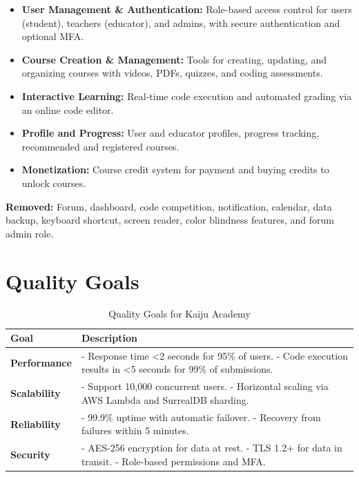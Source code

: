 \documentclass[a4paper, 11pt]{scrreprt}
\begin{document}
\begin{itemize}
    \item \textbf{User Management \& Authentication:} Role-based access control for users (student), teachers (educator), and admins, with secure authentication and optional MFA.
    \item \textbf{Course Creation \& Management:} Tools for creating, updating, and organizing courses with videos, PDFs, quizzes, and coding assessments.
    \item \textbf{Interactive Learning:} Real-time code execution and automated grading via an online code editor.
    \item \textbf{Profile and Progress:} User and educator profiles, progress tracking, recommended and registered courses.
    \item \textbf{Monetization:} Course credit system for payment and buying credits to unlock courses.
\end{itemize}

\textbf{Removed:} Forum, dashboard, code competition, notification, calendar, data backup, keyboard shortcut, screen reader, color blindness features, and forum admin role.

\section{Quality Goals}
\begin{table}[htp]
    \centering
    \begin{tabularx}{\textwidth}{|l|X|}
        \hline
        \textbf{Goal} & \textbf{Description} \\
        \hline
        \textbf{Performance} & - Response time <2 seconds for 95\% of users. \newline - Code execution results in <5 seconds for 99\% of submissions. \\
        \hline
        \textbf{Scalability} & - Support 10,000 concurrent users. \newline - Horizontal scaling via AWS Lambda and SurrealDB sharding. \\
        \hline
        \textbf{Reliability} & - 99.9\% uptime with automatic failover. \newline - Recovery from failures within 5 minutes. \\
        \hline
        \textbf{Security} & - AES-256 encryption for data at rest. \newline - TLS 1.2+ for data in transit. \newline - Role-based permissions and MFA. \\
        \hline
    \end{tabularx}
    \caption{Quality Goals for Kaiju Academy}
\end{table}
\end{document}
